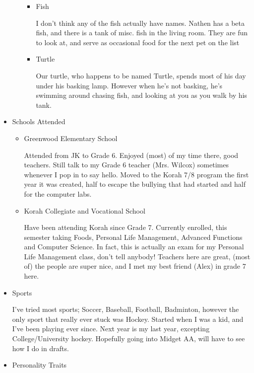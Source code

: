 \documentclass[11pt]{article}
\begin{document}
\begin{itemize}
\begin{itemize}
\begin{itemize}
\item Fish
\label{sec:org125309e}

I don't think any of the fish actually have names. Nathen has a beta fish, and there is a tank of misc. fish in the living room. They are fun to look at, and serve as occasional food for the next pet on the list

\item Turtle
\label{sec:orgd370d66}

Our turtle, who happens to be named Turtle, spends most of his day under his basking lamp. However when he's not basking, he's swimming around chasing fish, and looking at you as you walk by his tank.
\end{itemize}
\end{itemize}

\item Schools Attended
\label{sec:orgec6556d}
\begin{itemize}
\item Greenwood Elementary School
\label{sec:org1ba5937}

Attended from JK to Grade 6. Enjoyed (most) of my time there, good teachers. Still talk to my Grade 6 teacher (Mrs. Wilcox) sometimes whenever I pop in to say hello. Moved to the Korah 7/8 program the first year it was created, half to escape the bullying that had started and half for the computer labs. 

\item Korah Collegiate and Vocational School
\label{sec:org3719425}

Have been attending Korah since Grade 7. Currently enrolled, this semester taking Foods, Personal Life Management, Advanced Functions and Computer Science. In fact, this is actually an exam for my Personal Life Management class, don't tell anybody! Teachers here are great, (most of) the people are super nice, and I met my best friend (Alex) in grade 7 here.
\end{itemize}

\item Sports
\label{sec:orga1233e3}

I've tried most sports; Soccer, Baseball, Football, Badminton, however the only sport that really ever stuck was Hockey. Started when I was a kid, and I've been playing ever since. Next year is my last year, excepting College/University hockey. Hopefully going into Midget AA, will have to see how I do in drafts.

\item Personality Traits
\label{sec:org78beb7c}


\end{itemize}
\end{document}
